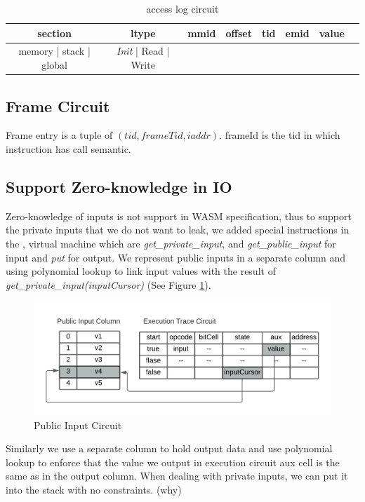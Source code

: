 \begin{table}[!h]
\begin{center}
\begin{tabular}{ | c | c | c | c | c | c | c | c |}
  \hline
  section & ltype & mmid & offset & tid & emid & value\\ 
  \hline
  memory | stack | global & \emph{Init} | Read | Write & & & & &\\
 \hline
\end{tabular}
\caption{access log circuit}
\label{tbl: rw-circuit}
\end{center}
\end{table}

\subsection{Frame Circuit}
\label{chp:frame-circuit}
Frame entry is a tuple of $(tid, frameTid, iaddr)$. 
frameId is the tid in which instruction has call semantic. 
\subsection{Support Zero-knowledge in IO}
Zero-knowledge of inputs is not support in WASM specification, thus to support the private inputs that we do not want to leak, we added special instructions in the \zkwasm, virtual machine which are \emph{get\_private\_input}, and \emph{get\_public\_input} for input and \emph{put} for output. We represent public inputs in a separate column and using polynomial lookup to link input values with the result of \emph{get\_private\_input(inputCursor)} (See Figure \ref{fig:public-input}).

\begin{figure}[!ht]
\centerline{
\includegraphics[scale=0.8]{figs/public-input.png}
}
\caption{Public Input Circuit}\label{fig:public-input}
\end{figure}
 Similarly we use a separate column to hold output data and use polynomial lookup to enforce that the value we output in execution circuit aux cell is the same as in the output column. When dealing with private inputs, we can put it into the stack with no constraints. (why)